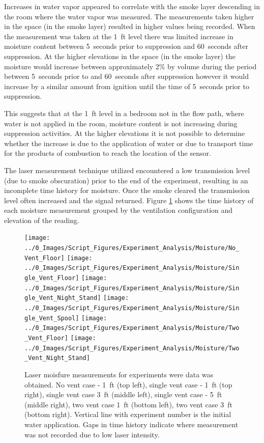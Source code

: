 \documentclass[12pt,oneside]{book}
\begin{document}
Increases in water vapor appeared to correlate with the smoke layer descending in the room where the water vapor was measured. The measurements taken higher in the space (in the smoke layer) resulted in higher values being recorded. When the measurement was taken at the 1~ft level there was limited increase in moisture content between 5~seconds prior to suppression and 60~seconds after suppression. At the higher elevations in the space (in the smoke layer) the moisture would increase between approximately 2\% by volume during the period between 5~seconds prior to and 60~seconds after suppression however it would increase by a similar amount from ignition until the time of 5~seconds prior to suppression. 

This suggests that at the 1~ft level in a bedroom not in the flow path, where water is not applied in the room, moisture content is not increasing during suppression activities. At the higher elevations it is not possible to determine whether the increase is due to the application of water or due to transport time for the products of combustion to reach the location of the sensor. 

The laser measurement technique utilized encountered a low transmission level (due to smoke obscuration) prior to the end of the experiment, resulting in an incomplete time history for moisture. Once the smoke cleared the transmission level often increased and the signal returned.  Figure \ref{fig:moisture_plots} shows the time history of each moisture measurement grouped by the ventilation configuration and elevation of the reading.

\begin{figure}[H]
\centering
\texttt{[image: ../0\_Images/Script\_Figures/Experiment\_Analysis/Moisture/No\_Vent\_Floor]} 
\texttt{[image: ../0\_Images/Script\_Figures/Experiment\_Analysis/Moisture/Single\_Vent\_Floor]}
\texttt{[image: ../0\_Images/Script\_Figures/Experiment\_Analysis/Moisture/Single\_Vent\_Night\_Stand]}
\texttt{[image: ../0\_Images/Script\_Figures/Experiment\_Analysis/Moisture/Single\_Vent\_Spool]}
\texttt{[image: ../0\_Images/Script\_Figures/Experiment\_Analysis/Moisture/Two\_Vent\_Floor]}
\texttt{[image: ../0\_Images/Script\_Figures/Experiment\_Analysis/Moisture/Two\_Vent\_Night\_Stand]}
\caption[Laser Moisture Measuremenfs]{Laser moisfure measurements for experiments were data was obtained. No vent case - 1~ft (top left), single vent case - 1~ft (top right), single vent case 3~ft (middle left), single vent case - 5~ft (middle right), two vent case 1~ft (bottom left), two vent case 3~ft (bottom right). Vertical line with experiment number is the initial water application. Gaps in time history indicate where measurement was not recorded due to low laser intensity.}
\label{fig:moisture_plots}
\end{figure}
\end{document}

